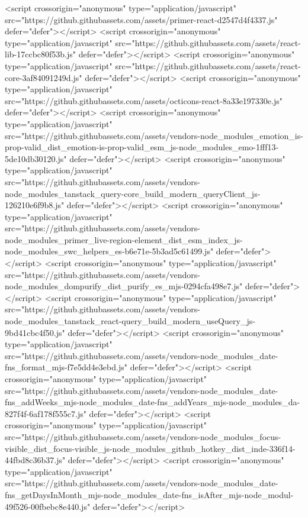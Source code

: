   <script crossorigin="anonymous" type="application/javascript" src="https://github.githubassets.com/assets/primer-react-d2547d4f4337.js" defer="defer"></script>
<script crossorigin="anonymous" type="application/javascript" src="https://github.githubassets.com/assets/react-lib-17ccbc80f53b.js" defer="defer"></script>
<script crossorigin="anonymous" type="application/javascript" src="https://github.githubassets.com/assets/react-core-3af84091249d.js" defer="defer"></script>
<script crossorigin="anonymous" type="application/javascript" src="https://github.githubassets.com/assets/octicons-react-8a33e197330e.js" defer="defer"></script>
<script crossorigin="anonymous" type="application/javascript" src="https://github.githubassets.com/assets/vendors-node_modules_emotion_is-prop-valid_dist_emotion-is-prop-valid_esm_js-node_modules_emo-1fff13-5de10db30120.js" defer="defer"></script>
<script crossorigin="anonymous" type="application/javascript" src="https://github.githubassets.com/assets/vendors-node_modules_tanstack_query-core_build_modern_queryClient_js-126210e6f9b8.js" defer="defer"></script>
<script crossorigin="anonymous" type="application/javascript" src="https://github.githubassets.com/assets/vendors-node_modules_primer_live-region-element_dist_esm_index_js-node_modules_swc_helpers_es-b6e71e-5b3ad5c61499.js" defer="defer"></script>
<script crossorigin="anonymous" type="application/javascript" src="https://github.githubassets.com/assets/vendors-node_modules_dompurify_dist_purify_es_mjs-0294cfa498e7.js" defer="defer"></script>
<script crossorigin="anonymous" type="application/javascript" src="https://github.githubassets.com/assets/vendors-node_modules_tanstack_react-query_build_modern_useQuery_js-9bd41cbc4f50.js" defer="defer"></script>
<script crossorigin="anonymous" type="application/javascript" src="https://github.githubassets.com/assets/vendors-node_modules_date-fns_format_mjs-f7e5dd4e3ebd.js" defer="defer"></script>
<script crossorigin="anonymous" type="application/javascript" src="https://github.githubassets.com/assets/vendors-node_modules_date-fns_addWeeks_mjs-node_modules_date-fns_addYears_mjs-node_modules_da-827f4f-6af178f555c7.js" defer="defer"></script>
<script crossorigin="anonymous" type="application/javascript" src="https://github.githubassets.com/assets/vendors-node_modules_focus-visible_dist_focus-visible_js-node_modules_github_hotkey_dist_inde-336f14-44fbd8c36b37.js" defer="defer"></script>
<script crossorigin="anonymous" type="application/javascript" src="https://github.githubassets.com/assets/vendors-node_modules_date-fns_getDaysInMonth_mjs-node_modules_date-fns_isAfter_mjs-node_modul-49f526-00fbebc8e440.js" defer="defer"></script>
